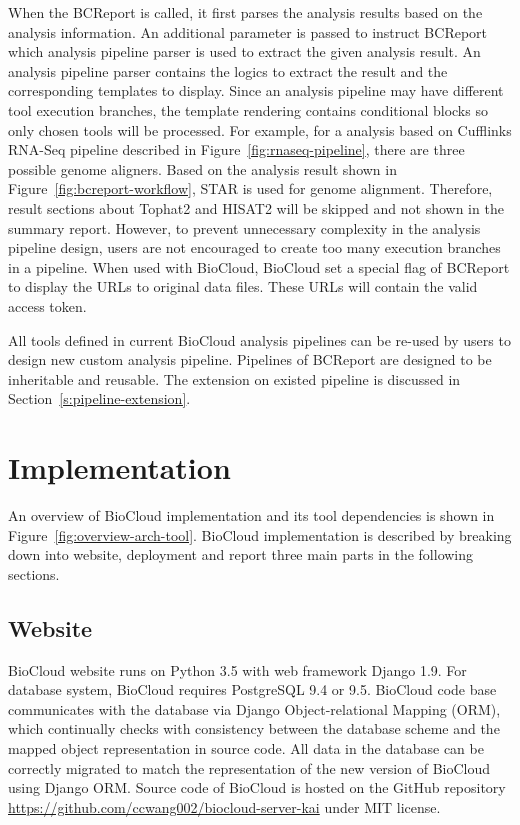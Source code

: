 When the BCReport is called, it first parses the analysis results based on the
analysis information. An additional parameter is passed to instruct BCReport
which analysis pipeline parser is used to extract the given analysis result. An
analysis pipeline parser contains the logics to extract the result and the
corresponding templates to display. Since an analysis pipeline may have
different tool execution branches, the template rendering contains conditional
blocks so only chosen tools will be processed. For example, for a analysis
based on Cufflinks RNA-Seq pipeline described in
Figure~\ref{fig:rnaseq-pipeline}, there are three possible genome aligners.
Based on the analysis result shown in Figure~\ref{fig:bcreport-workflow}, STAR
is used for genome alignment. Therefore, result sections about Tophat2 and
HISAT2 will be skipped and not shown in the summary report. However, to prevent
unnecessary complexity in the analysis pipeline design, users are not
encouraged to create too many execution branches in a pipeline. When used with
BioCloud, BioCloud set a special flag of BCReport to display the URLs to
original data files. These URLs will contain the valid access token.

All tools defined in current BioCloud analysis pipelines can be re-used by
users to design new custom analysis pipeline. Pipelines of BCReport are
designed to be inheritable and reusable. The extension on existed pipeline is
discussed in Section~\ref{s:pipeline-extension}.



\section{Implementation}



An overview of BioCloud implementation and its tool dependencies is shown in
Figure~\ref{fig:overview-arch-tool}. BioCloud implementation is described by
breaking down into website, deployment and report three main parts in the
following sections.


\subsection{Website}

BioCloud website runs on Python 3.5 with web framework Django 1.9. For database
system, BioCloud requires PostgreSQL 9.4 or 9.5. BioCloud code base
communicates with the database via Django Object-relational Mapping (ORM),
which continually checks with consistency between the database scheme and the
mapped object representation in source code. All data in the database can be
correctly migrated to match the representation of the new version of BioCloud
using Django ORM. Source code of BioCloud is hosted on the GitHub repository
\url{https://github.com/ccwang002/biocloud-server-kai} under MIT license.

